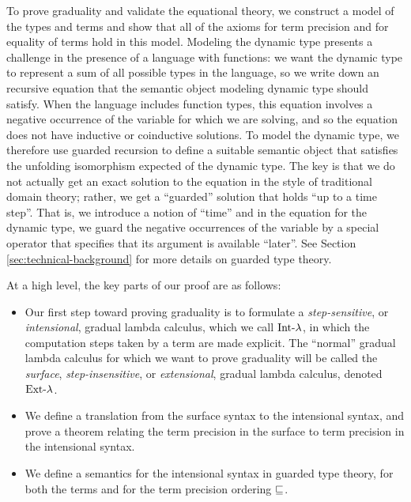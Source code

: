 To prove graduality and validate the equational theory, we construct a model of the types
and terms and show that all of the axioms for term precision and for equality of terms
hold in this model. Modeling the dynamic type presents a challenge in the presence of a
language with functions: we want the dynamic type to represent a sum of all possible types
in the language, so we write down an recursive equation that the semantic object modeling
dynamic type should satisfy. When the language includes function types, this equation involves a
negative occurrence of the variable for which we are solving, and so the equation 
does not have inductive or coinductive solutions.
%
To model the dynamic type, we therefore use guarded recursion to define a suitable
semantic object that satisfies the unfolding isomorphism expected of the dynamic type.
The key is that we do not actually get an exact solution to the equation in the style
of traditional domain theory; rather, we get a ``guarded'' solution that holds ``up to a time step''.
%
That is, we introduce a notion of ``time'' and in the equation for the dynamic type,
we guard the negative occurrences of the variable by a special operator that
specifies that its argument is available ``later''.
See Section \ref{sec:technical-background} for more details on guarded type theory.

At a high level, the key parts of our proof are as follows:

\begin{itemize}
  \item Our first step toward proving graduality is to formulate a \emph{step-sensitive},
  or \emph{intensional}, gradual lambda calculus, which we call $\text{Int-}\lambda$, in which the
  computation steps taken by a term are made explicit.
  The ``normal'' gradual lambda calculus for which we want to prove graduality will be called the
  \emph{surface}, \emph{step-insensitive}, or \emph{extensional}, gradual lambda calculus,
  denoted $\text{Ext-}\lambda$.

  \item We define a translation from the surface syntax to the intensional syntax, and
  prove a theorem relating the term precision in the surface to term precision in the
  intensional syntax.
  
  \item We define a semantics for the intensional syntax in guarded type theory, for both the
  terms and for the term precision ordering $\sqsubseteq$.

\end{itemize}
